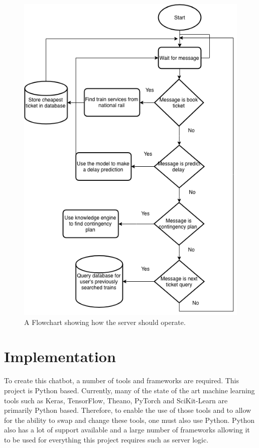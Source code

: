 \documentclass[12pt,a4paper]{article}
\begin{document}
    \begin{figure}[H]
        \centering
        \includegraphics[scale=0.7]{Images/server_flowchart.png}
        \caption{A Flowchart showing how the server should operate.}
        \label{fig:server_flowchat}
    \end{figure}
    
    \section{Implementation}
    
    To create this chatbot, a number of tools and frameworks are required. This project is Python based. Currently, many of the state of the art machine learning tools such as Keras, TensorFlow, Theano, PyTorch and SciKit-Learn are primarily Python based. Therefore, to enable the use of those tools and to allow for the ability to swap and change these tools, one must also use Python. Python also has a lot of support available and a large number of frameworks allowing it to be used for everything this project requires such as server logic.
    
\end{document}
